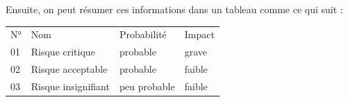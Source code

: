 Ensuite, on peut résumer ces informations dans un tableau comme ce qui suit :

\begin{tabular}{ | l | l | l | l | }
  N° & Nom & Probabilité & Impact \\
  \rowcolor{red!60}
  01 & Risque critique & probable & grave \\
  \rowcolor{red!20}
  02 & Risque acceptable & probable & faible \\
  03 & Risque insignifiant & peu probable & faible
\end{tabular}